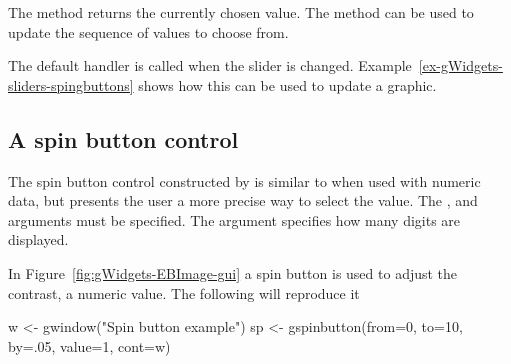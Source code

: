 The  method returns the currently chosen
value. The \method{[\ASSIGN}{gslider} method can be used to update the
sequence of values to choose from. 

The default handler is called when the slider is changed. Example~\ref{ex-gWidgets-sliders-spingbuttons}
shows how this can be used to update a graphic.


\subsection{A spin button control}
\label{sec:gWidgets-spin-button-control}

The spin button control constructed by  is
similar to  when used with numeric data, but
presents the user a more precise way to select the value. The
,  and  arguments must be specified. The
argument  specifies how many digits are
displayed.

In Figure~\ref{fig:gWidgets-EBImage-gui} a spin button is used to
adjust the contrast, a numeric value. The following will reproduce it

\begin{Schunk}
\begin{Sinput}
 w <- gwindow("Spin button example")
 sp <- gspinbutton(from=0, to=10, by=.05, value=1, cont=w)
\end{Sinput}
\end{Schunk}








